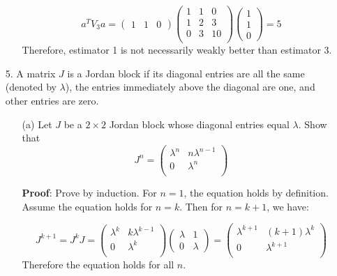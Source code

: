 \documentclass{article}
\begin{document}
\begin{enumerate}
\begin{enumerate}
        $$ a^T V_3 a = 
        \begin{pmatrix}1 &1 &0\end{pmatrix} 
        \begin{pmatrix}
            1 & 1 & 0 \\
            1 & 2 & 3 \\
            0 & 3 & 10 \\
        \end{pmatrix}
        \begin{pmatrix}1\\ 1\\ 0\end{pmatrix}
        = 5
        $$
        Therefore, estimator 1 is not necessarily weakly better than estimator 3. \\
    \end{enumerate}


    \item[5. ] A matrix $J$ is a Jordan block if its diagonal entries are all the same (denoted by $\lambda$), the entries immediately above the diagonal are one, and other entries are zero.
    \begin{enumerate}
        \item[(a)] Let $J$ be a $2 \times 2$ Jordan block whose diagonal entries equal $\lambda$. Show that
        $$ J^n = 
        \begin{pmatrix}
            \lambda^n & n\lambda^{n-1} \\
            0 & \lambda^n \\
        \end{pmatrix} $$
        
        \textbf{Proof}: Prove by induction. For $n=1$, the equation holds by definition. Assume the equation holds for $n=k$. Then for $n=k+1$, we have:
        
        $$ J^{k+1} = J^k J =  
        \begin{pmatrix}
            \lambda^k & k\lambda^{k-1} \\
            0 & \lambda^k \\
        \end{pmatrix} 
        \begin{pmatrix}
        \lambda & 1 \\
        0 & \lambda
        \end{pmatrix} = 
        \begin{pmatrix}
            \lambda^{k+1} & (k+1)\lambda^{k} \\
            0 & \lambda^{k+1} \\
        \end{pmatrix} 
        $$
        Therefore the equation holds for all $n$. \\
        

\end{enumerate}
\end{enumerate}
\end{document}
